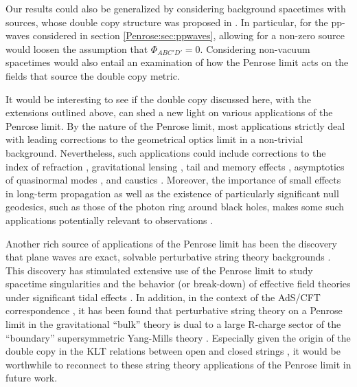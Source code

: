 Our results could also be generalized by considering background spacetimes with sources,
whose double copy structure was proposed in \cite{Easson:2021asd,Easson:2022zoh}. In particular, for the pp-waves
considered in section \ref{Penrose:sec:ppwaves}, allowing for a non-zero source would loosen the assumption that
$\Phi_{ABC'D'} = 0$. Considering non-vacuum spacetimes would also entail an examination of how the Penrose limit
acts on the fields that source the double copy metric.

It would be interesting to see if the double copy discussed here, with the extensions outlined above, can shed a new light on various applications of the Penrose limit. By the nature of the Penrose limit, most applications strictly deal with leading corrections to the geometrical optics limit in a non-trivial background. Nevertheless, such applications could include corrections to the index of refraction \cite{Hollowood:2007ku,Hollowood:2009qz}, gravitational lensing \cite{Harte:2012jg, Harte:2015ila}, tail and memory effects \cite{harte2013tails,Zhang:2017rno,Zhang:2017geq,Flanagan:2019ezo}, asymptotics of quasinormal modes \cite{Fransen:2023eqj}, and caustics \cite{Harte:2012uw}. Moreover, the importance of small effects in long-term propagation as well as the existence of particularly significant null geodesics, such as those of the photon ring around black holes, makes some such applications potentially relevant to observations \cite{Perlman:2014cwa,Cardoso:2016rao,Baker:2017hug,Cunha:2018acu,Johnson:2019ljv,Hadar:2022xag,Paugnat:2022qzy,Cardenas-Avendano:2023dzo,Lee:2023kry,Jia:2024mlb}.

Another rich source of applications of the Penrose limit has been the discovery that plane waves are exact, solvable perturbative string theory backgrounds \cite{Gueven:1987ad,Amati:1988sa,Horowitz:1989bv,Horowitz:1990sr,Kiritsis:1993jk,Russo:2002rq,Papadopoulos:2002bg,Berenstein:2002jq,Eberhardt:2018exh}. This discovery has stimulated extensive use of the Penrose limit to study spacetime singularities and the behavior (or break-down) of effective field theories under significant tidal effects \cite{Horowitz:1990sr,Blau:2003dz,Blau:2004yi,Giddings:2007bw,Hollowood:2007ku,Craps:2008bv,Hollowood:2009qz,Hollowood:2011yh,Martinec:2020cml,Bena:2020iyw,Dodelson:2020lal,Nishii:2021ylb,Balivada:2023akk,Horowitz:2024dch,Guo:2024pvv}. In addition, in the context of the AdS/CFT correspondence \cite{Maldacena:1997re,Witten:1998qj,Aharony:1999ti}, it has been found that perturbative string theory on a Penrose limit in the gravitational ``bulk'' theory is dual to a large R-charge sector of the ``boundary'' supersymmetric Yang-Mills theory \cite{Berenstein:2002jq,Plefka:2003nb,Sadri:2003pr}. Especially given the origin of the double copy in the KLT relations between open and closed strings \cite{Kawai:1985xq}, it would be worthwhile to reconnect to these string theory applications of the Penrose limit in future work. 

